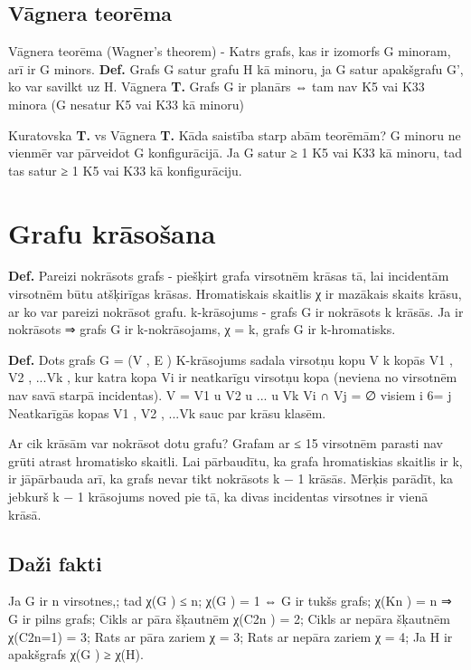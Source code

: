 \documentclass{article}
\begin{document}
\subsection{Vāgnera teorēma}

Vāgnera teorēma (Wagner's theorem) - Katrs grafs, kas ir izomorfs G minoram, arī ir G minors.
\textbf{Def.}  Grafs G satur grafu H kā minoru, ja G satur apakšgrafu G', ko var savilkt uz H.
Vāgnera \textbf{T. } Grafs G ir planārs ⇔ tam nav K5 vai K33 minora (G nesatur K5 vai K33 kā minoru)

Kuratovska \textbf{T. }vs Vāgnera \textbf{T. }Kāda saistība starp abām teorēmām? G minoru ne vienmēr var pārveidot G konfigurācijā. Ja G satur ≥ 1 K5 vai K33 kā minoru, tad tas satur ≥ 1 K5 vai K33 kā konfigurāciju.

\section{Grafu krāsošana}

\textbf{Def.}  Pareizi nokrāsots grafs - piešķirt grafa virsotnēm krāsas tā, lai incidentām virsotnēm būtu atšķirīgas krāsas.  Hromatiskais skaitlis χ ir mazākais skaits krāsu, ar ko var pareizi nokrāsot grafu.  k-krāsojums - grafs G ir nokrāsots k krāsās. Ja ir nokrāsots ⇒ grafs G ir k-nokrāsojams, χ = k, grafs G ir k-hromatisks.

\textbf{Def.}  Dots grafs G = (V , E ) K-krāsojums sadala virsotņu kopu V k kopās V1 , V2 , ...Vk , kur katra kopa Vi ir neatkarīgu virsotņu kopa (neviena no virsotnēm nav savā starpā incidentas).  V = V1 u V2 u ... u Vk Vi ∩ Vj = ∅ visiem i 6= j
Neatkarīgās kopas V1 , V2 , ...Vk sauc par krāsu klasēm.

Ar cik krāsām var nokrāsot dotu grafu?  Grafam ar ≤ 15 virsotnēm parasti nav grūti atrast hromatisko skaitli.  Lai pārbaudītu, ka grafa hromatiskias skaitlis ir k, ir jāpārbauda arī, ka grafs nevar tikt nokrāsots k − 1 krāsās.  Mērķis parādīt, ka jebkurš k − 1 krāsojums noved pie tā, ka divas incidentas virsotnes ir vienā krāsā.
 
\subsection{Daži fakti}
Ja G ir n virsotnes,;
tad χ(G ) ≤ n;
χ(G ) = 1 ⇔ G ir tukšs grafs;
χ(Kn ) = n ⇒ G ir pilns grafs;
Cikls ar pāra šķautnēm χ(C2n ) = 2;
Cikls ar nepāra šķautnēm χ(C2n=1) = 3;
Rats ar pāra zariem χ = 3;
Rats ar nepāra zariem χ = 4;
Ja H ir apakšgrafs χ(G ) ≥ χ(H).
\end{document}
